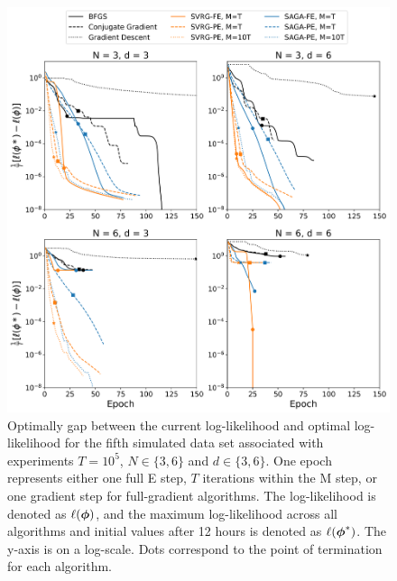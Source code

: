 \documentclass[12pt]{article}
\begin{document}
\begin{figure}[H]
    \centering
    \includegraphics[width=6.5in]{../plt/log-like_v_epoch_T-100000-004.png}
    \caption{Optimally gap between the current log-likelihood and optimal log-likelihood for the fifth simulated data set associated with experiments $T=10^{5}$, $N \in \{3,6\}$ and $d \in \{3,6\}$. One epoch represents either one full E step, $T$ iterations within the M step, or one gradient step for full-gradient algorithms. The log-likelihood is denoted as $\ell(\boldsymbol{\phi})$, and the maximum log-likelihood across all algorithms and initial values after 12 hours is denoted as $\ell(\boldsymbol{\phi}^*)$. The y-axis is on a log-scale. Dots correspond to the point of termination for each algorithm.}
\end{figure}
%
\end{document}
